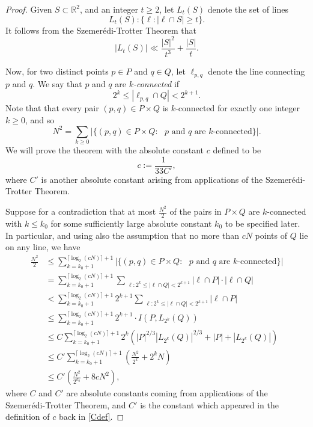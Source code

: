 \documentclass[11pt,oneside]{amsart}
\numberwithin{exercise}{subsection}
\begin{document}
\begin{proof}
    Given $S \subset \mathbb R^2$, and an integer $t \geq 2$, let $L_t(S)$ denote the set of lines
    \[
    L_t(S): \{ \ell:  |\ell \cap S| \geq t \}.
    \]
    It follows from the Szemer\'{e}di-Trotter Theorem that
    \begin{equation} \label{STcor}
    |L_t(S)| \ll \frac{|S|^2}{t^3}+ \frac{|S|}{t}.
    \end{equation}

    Now, for two distinct points $p \in P$ and $q \in Q$, let $\ell_{p,q}$ denote the line connecting $p$ and $q$. We say that $p$ and $q$ are \textit{$k$-connected} if
    \[
    2^k \leq |\ell_{p,q} \cap Q| < 2^{k+1}.
    \]
    Note that that every pair $(p,q) \in P \times Q$ is $k$-connected for exactly one integer $k \geq 0$, and so
    \[
    N^2= \sum_{k \geq 0} | \{ (p,q) \in P \times Q:\text{ $p$ and $q$ are $k$-connected}\}|.
    \]
    We will prove the theorem with the absolute constant $c$ defined to be
    \begin{equation} \label{Cdef}
    c:=\frac{1}{33C'},
    \end{equation}
    where $C'$ is another absolute constant arising from applications of the Szemer\'{e}di-Trotter Theorem.
    


    Suppose for a contradiction that at most $\frac{N^2}{2}$ of the pairs in $P \times Q$ are $k$-connected with $k \leq k_0$ for some sufficiently large absolute constant $k_0$ to be specified later. In particular, and using also the assumption that no more than $cN$ points of $Q$ lie on any line, we have
    \begin{align*}
    \frac{N^2}{2} &\leq \sum_{k = k_0+1}^{\lceil \log_2(cN) \rceil+1} | \{ (p,q) \in P \times Q:\text{ $p$ and $q$ are $k$-connected}\}|
    \\& = \sum_{k = k_0+ 1}^{\lceil \log_2(cN) \rceil+1} \sum_{ \,\, \ell : 2^k \leq | \ell \cap Q|<2^{k+1}} |\ell \cap P| \cdot | \ell \cap Q|
    \\& < \sum_{k = k_0+ 1}^{\lceil \log_2(cN) \rceil+1} 2^{k+1} \sum_{ \,\, \ell : 2^k \leq | \ell \cap Q|<2^{k+1}} |\ell \cap P| 
    \\& \leq   \sum_{k = k_0+ 1}^{\lceil \log_2(cN) \rceil+1} 2^{k+1} \cdot  I(P, L_{2^k}(Q))
    \\& \leq C \sum_{k = k_0+ 1}^{\lceil \log_2(cN) \rceil+1} 2^k\left ( |P|^{2/3}|L_{2^k}(Q)|^{2/3} +|P| + |L_{2^k}(Q)| \right )
    \\& \leq C'\sum_{k = k_0+ 1}^{\lceil \log_2(cN) \rceil+1} \left ( \frac{N^2}{2^k} + 2^k N   \right )
    \\& \leq C' \left ( \frac{N^2}{2^{k_0}} + 8cN^2 \right ),
    \end{align*}
    where $C$ and $C'$ are absolute constants coming from applications of the Szemer\'{e}di-Trotter Theorem, and $C'$ is the constant which appeared in the definition of $c$ back in \eqref{Cdef}.


\end{proof}
\end{document}
